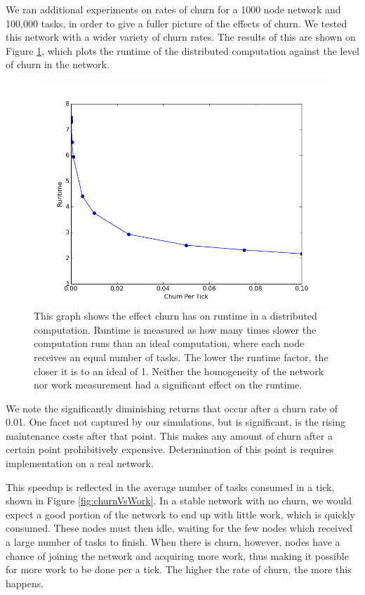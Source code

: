 \documentclass[11pt,letterpaper]{article}
\begin{document}
{	
	We ran additional experiments on rates of churn for a 1000 node network and 100,000 tasks, in order to give a fuller picture of the effects of churn.
	We tested this network with a wider variety of churn rates.
	The results of this are shown on Figure \ref{fig:churnVsTime}, which plots the runtime of the distributed computation against the level of churn in the network.
	
	
	\begin{figure}[h]
		\centering
		\includegraphics[width=0.7\linewidth]{figs/churnVsTime}
		\caption[Churn vs Runtime factor]{This graph shows the effect churn has on runtime in a distributed computation.
			Runtime is measured as how many times slower the computation runs than an ideal computation, where each node receives an equal number of tasks.
			The lower the runtime factor, the closer it is to an ideal of 1.
			Neither the homogeneity of the network nor work measurement had a significant effect on the runtime.}
		\label{fig:churnVsTime}
	\end{figure}
	
	We note the significantly diminishing returns that occur after a churn rate of 0.01.
	One facet not captured by our simulations, but is significant, is the rising maintenance costs after that point.
	This makes any amount of churn after a certain point prohibitively expensive.
	Determination of  this point is requires implementation on a real network.
	
	This speedup is reflected in the average number of tasks consumed in a tick, shown in Figure \ref{fig:churnVsWork}.
	In a stable network with no churn, we would expect a good portion of the network to end up with little work, which is quickly consumed.
	These nodes must then idle, waiting for the few nodes which received a large number of tasks to finish.
	When there is churn, however, nodes have a chance of joining the network and acquiring more work, thus making it possible for more work to be done per a tick.
	The higher the rate of churn, the more this happens.
	
}
\end{document}
